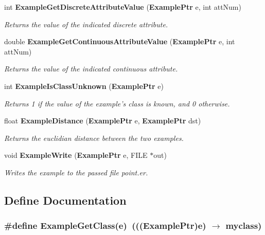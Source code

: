 \begin{CompactItemize}
int {\bf Example\-Get\-Discrete\-Attribute\-Value} ({\bf Example\-Ptr} e, int att\-Num)
\begin{CompactList}\small\item\em Returns the value of the indicated discrete attribute. \item\end{CompactList}\item 
double {\bf Example\-Get\-Continuous\-Attribute\-Value} ({\bf Example\-Ptr} e, int att\-Num)
\begin{CompactList}\small\item\em Returns the value of the indicated continuous attribute. \item\end{CompactList}\item 
int {\bf Example\-Is\-Class\-Unknown} ({\bf Example\-Ptr} e)
\begin{CompactList}\small\item\em Returns 1 if the value of the example's class is known, and 0 otherwise. \item\end{CompactList}\item 
float {\bf Example\-Distance} ({\bf Example\-Ptr} e, {\bf Example\-Ptr} dst)
\begin{CompactList}\small\item\em Returns the euclidian distance between the two examples. \item\end{CompactList}\item 
void {\bf Example\-Write} ({\bf Example\-Ptr} e, FILE $\ast$out)
\begin{CompactList}\small\item\em Writes the example to the passed file point.er. \item\end{CompactList}\end{CompactItemize}


\subsection{Define Documentation}
\subsubsection{\setlength{\rightskip}{0pt plus 5cm}\#define Example\-Get\-Class(e)\ ((({\bf Example\-Ptr})e) $\rightarrow$ myclass)}\label{Example_8h_a3}


